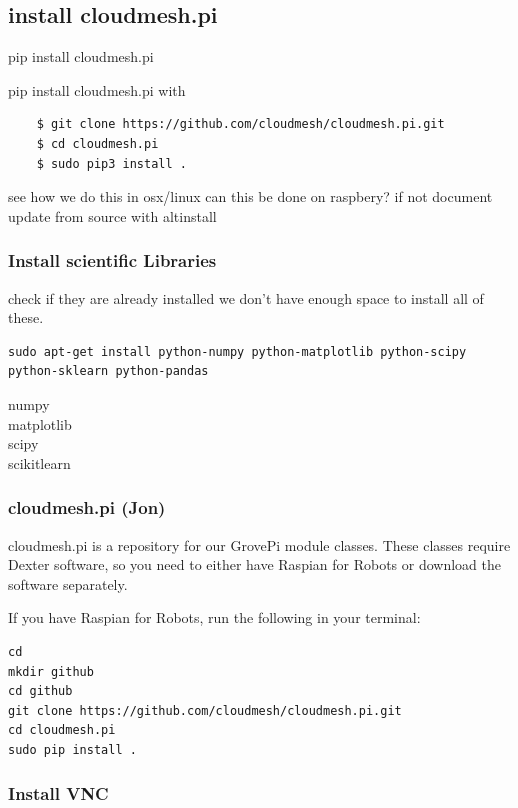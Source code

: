\subsection{install cloudmesh.pi}\label{install-cloudmesh.pi}

pip install cloudmesh.pi

pip install cloudmesh.pi with

\begin{verbatim}
    $ git clone https://github.com/cloudmesh/cloudmesh.pi.git
    $ cd cloudmesh.pi
    $ sudo pip3 install .
\end{verbatim}

see how we do this in osx/linux can this be done on raspbery? if not
document update from source with altinstall

\subsubsection{Install scientific
Libraries}\label{install-scientific-libraries}

check if they are already installed we don't have enough space to
install all of these.

\begin{verbatim}
sudo apt-get install python-numpy python-matplotlib python-scipy python-sklearn python-pandas
\end{verbatim}

numpy\\
matplotlib\\
scipy\\
scikitlearn

\subsubsection{cloudmesh.pi (Jon)}\label{cloudmesh.pi-jon}

cloudmesh.pi is a repository for our GrovePi module classes. These
classes require Dexter software, so you need to either have Raspian for
Robots or download the software separately.

If you have Raspian for Robots, run the following in your terminal:

\begin{verbatim}
cd
mkdir github
cd github
git clone https://github.com/cloudmesh/cloudmesh.pi.git
cd cloudmesh.pi
sudo pip install .
\end{verbatim}

\subsubsection{Install VNC}\label{install-vnc}

